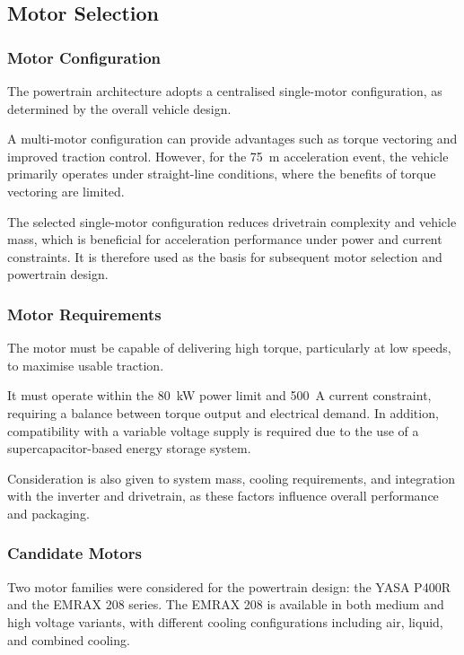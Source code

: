 \documentclass[a4paper,12pt]{article}
\begin{document}
\subsection{Motor Selection}

\subsubsection{Motor Configuration}

The powertrain architecture adopts a centralised single-motor configuration, as determined by the overall vehicle design.

A multi-motor configuration can provide advantages such as torque vectoring and improved traction control. However, for the \SI{75}{\meter} acceleration event, the vehicle primarily operates under straight-line conditions, where the benefits of torque vectoring are limited.

The selected single-motor configuration reduces drivetrain complexity and vehicle mass, which is beneficial for acceleration performance under power and current constraints. It is therefore used as the basis for subsequent motor selection and powertrain design.

\subsubsection{Motor Requirements}

The motor must be capable of delivering high torque, particularly at low speeds, to maximise usable traction.

It must operate within the \SI{80}{\kilo\watt} power limit and \SI{500}{\ampere} current constraint, requiring a balance between torque output and electrical demand. In addition, compatibility with a variable voltage supply is required due to the use of a supercapacitor-based energy storage system.

Consideration is also given to system mass, cooling requirements, and integration with the inverter and drivetrain, as these factors influence overall performance and packaging.

\subsubsection{Candidate Motors}

Two motor families were considered for the powertrain design: the YASA P400R and the EMRAX 208 series. The EMRAX 208 is available in both medium and high voltage variants, with different cooling configurations including air, liquid, and combined cooling.
\end{document}
